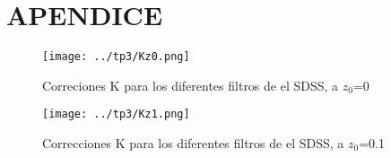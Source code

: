 \documentclass[a4paper,10pt]{article}
\def\aj {AJ}
\def\mnras {MNRAS}
\begin{document}
\section{APENDICE}
\begin{figure}[H]
 \centering
 \texttt{[image: ../tp3/Kz0.png]}
 \caption{Correciones K para los diferentes filtros de el SDSS, a $z_{0}$=0 }
 \label{fig:1}
\end{figure}
\begin{figure}[H]
 \centering
 \texttt{[image: ../tp3/Kz1.png]}
 \caption{Correcciones K para los diferentes filtros de el SDSS, a $z_{0}$=0.1}
\end{figure}



















\end{document}
